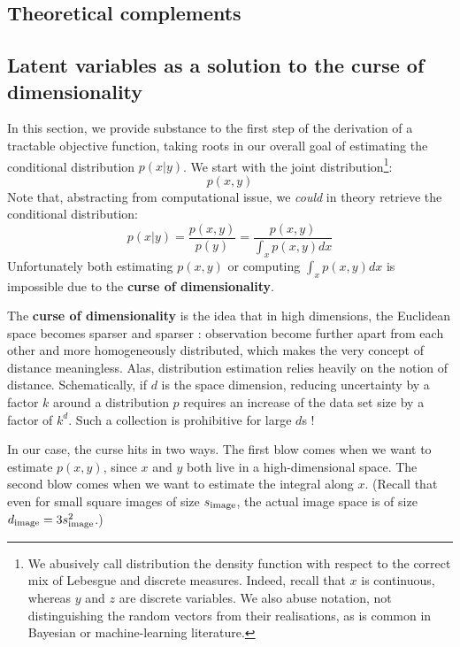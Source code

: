 \documentclass{article}
\begin{document}
{}
\begin{appendix}

\section{Theoretical complements}

\begin{multicols}{2}

\subsection{Latent variables as a solution to the curse of dimensionality} \label{app:latent}

In this section, we provide substance to the first step of the derivation of a tractable objective function, taking roots in our overall goal of estimating the conditional distribution $p(x|y)$. We start with the joint distribution\footnote{We abusively call distribution the density function with respect to the correct mix of Lebesgue and discrete measures. Indeed, recall that $x$ is continuous, whereas $y$ and $z$ are discrete variables. We also abuse notation, not distinguishing the random vectors from their realisations, as is common in Bayesian or machine-learning literature.}: $$p(x,y)$$
Note that, abstracting from computational issue, we \textit{could} in theory retrieve the conditional distribution: $$p(x|y)=\frac{p(x,y)}{p(y)}=\frac{p(x,y)}{\int_x p(x,y)dx} $$
Unfortunately both estimating $p(x,y)$ or computing $\int_x p(x,y)dx$ is impossible due to the \textbf{curse of dimensionality}.

The \textbf{curse of dimensionality} is the idea that in high dimensions, the Euclidean space becomes sparser and sparser : observation become further apart from each other and more homogeneously distributed, which makes the very concept of distance meaningless. Alas, distribution estimation relies heavily on the notion of distance. Schematically, if $d$ is the space dimension, reducing uncertainty by a factor $k$ around a distribution $p$ requires an increase of the data set size by a factor of $k^d$. Such a collection is prohibitive for large $d$s !

In our case, the curse hits in two ways. The first blow comes when we want to estimate $p(x,y)$, since $x$ and $y$ both live in a high-dimensional space. The second blow comes when we want to estimate the integral along $x$. (Recall that even for small square images of size $s_{\mathrm{image}}$, the actual image space is of size $d_{\mathrm{image}}=3s_{\mathrm{image}}^2$.)


\end{multicols}
\end{appendix}
\end{document}
